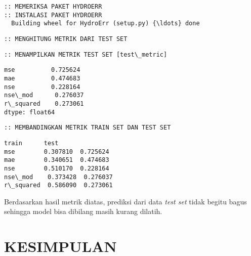 \documentclass[11pt]{article}
\makeatletter
\newcommand{\boxspacing}{\kern\kvtcb@left@rule\kern\kvtcb@boxsep}
\newcommand{\prompt}[4]{
        \ttfamily\llap{{\color{#2}[#3]:\hspace{3pt}#4}}\vspace{-\baselineskip}
    }
\let\oldsection\section
\renewcommand\section{\clearpage\oldsection}
\makeatother
\begin{document}
    \begin{Verbatim}[commandchars=\\\{\}]
:: MEMERIKSA PAKET HYDROERR
:: INSTALASI PAKET HYDROERR
  Building wheel for HydroErr (setup.py) {\ldots} done
    \end{Verbatim}

    \begin{Verbatim}[commandchars=\\\{\}]
:: MENGHITUNG METRIK DARI TEST SET
    \end{Verbatim}

    \begin{Verbatim}[commandchars=\\\{\}]
:: MENAMPILKAN METRIK TEST SET [test\_metric]
    \end{Verbatim}

            \begin{tcolorbox}[breakable, size=fbox, boxrule=.5pt, pad at break*=1mm, opacityfill=0]
\prompt{Out}{outcolor}{66}{\boxspacing}
\begin{Verbatim}[commandchars=\\\{\}]
mse          0.725624
mae          0.474683
nse          0.228164
nse\_mod      0.276037
r\_squared    0.273061
dtype: float64
\end{Verbatim}
\end{tcolorbox}
        
    \begin{Verbatim}[commandchars=\\\{\}]
:: MEMBANDINGKAN METRIK TRAIN SET DAN TEST SET
    \end{Verbatim}

            \begin{tcolorbox}[breakable, size=fbox, boxrule=.5pt, pad at break*=1mm, opacityfill=0]
\prompt{Out}{outcolor}{67}{\boxspacing}
\begin{Verbatim}[commandchars=\\\{\}]
              train      test
mse        0.307810  0.725624
mae        0.340651  0.474683
nse        0.510170  0.228164
nse\_mod    0.373428  0.276037
r\_squared  0.586090  0.273061
\end{Verbatim}
\end{tcolorbox}
        
    Berdasarkan hasil metrik diatas, prediksi dari data \emph{test set}
tidak begitu bagus sehingga model bisa dibilang masih kurang dilatih.

    \hypertarget{kesimpulan}{%
\section{KESIMPULAN}\label{kesimpulan}}
\end{document}
